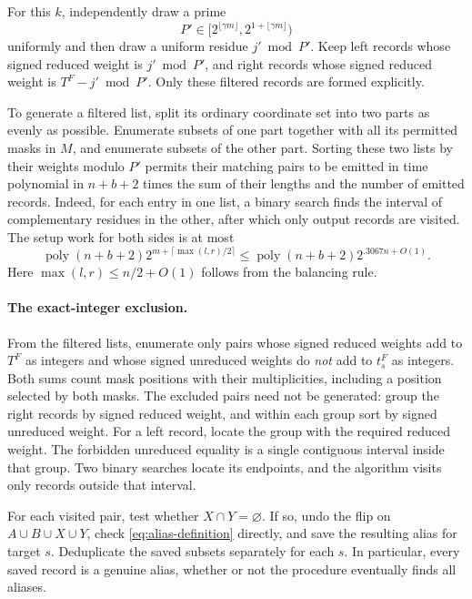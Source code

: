 For this $k$, independently draw a prime
\[
 P'\in[2^{\lfloor\gamma m\rfloor},2^{1+\lfloor\gamma m\rfloor})
\]
uniformly and then draw a uniform residue $j'\bmod P'$.  Keep left records
whose signed reduced weight is $j'\bmod P'$, and right records whose
signed reduced weight is $T^F-j'\bmod P'$.
Only these filtered records are formed explicitly.

To generate a filtered list, split its ordinary coordinate set into two
parts as evenly as possible.  Enumerate subsets of one part together with
all its permitted masks in $M$, and enumerate subsets of the other part.
Sorting these two lists by their weights modulo $P'$ permits their
matching pairs to be emitted in time polynomial in $n+b+2$ times the
sum of their lengths and the number of emitted records.  Indeed, for each
entry in one list, a binary search finds the interval of complementary
residues in the other, after which only output records are visited.
The setup work for both sides is at most
\begin{equation}
 \operatorname{poly}(n+b+2)
     2^{m+\lceil\max(l,r)/2\rceil}
 \le \operatorname{poly}(n+b+2)2^{.3067n+O(1)}.
 \label{eq:alias-generation}
\end{equation}
Here $\max(l,r)\le n/2+O(1)$ follows from the balancing rule.

\paragraph{The exact-integer exclusion.}
From the filtered lists, enumerate only pairs whose signed reduced
weights add to $T^F$ as integers and whose signed unreduced weights
do \emph{not} add to $t_s^F$ as integers.  Both sums count mask positions
with their multiplicities, including a position selected by both masks.
The excluded pairs need not be generated: group the right records by
signed reduced weight, and within each group sort by signed unreduced
weight.  For a left record, locate the group with the required reduced
weight.  The forbidden unreduced equality is a single contiguous interval
inside that group.  Two binary searches locate its endpoints, and the
algorithm visits only records outside that interval.

For each visited pair, test whether $X\cap Y=\varnothing$.  If so,
undo the flip on $A\cup B\cup X\cup Y$, check
\eqref{eq:alias-definition} directly, and save the resulting alias for
target $s$.  Deduplicate the saved subsets separately for each $s$.
In particular, every saved record is a genuine alias, whether or not
the procedure eventually finds all aliases.

